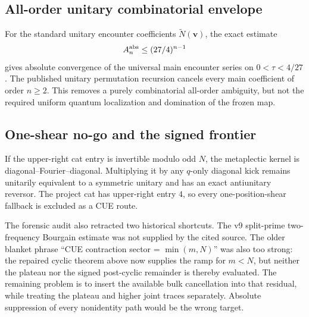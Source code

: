 \subsection{All-order unitary combinatorial envelope}
For the standard unitary encounter coefficients $\widetilde N(\mathbf v)$,
the exact estimate
\[
 A_n^{\rm abs}\le(27/4)^{n-1}
\]
gives absolute convergence of the universal main encounter series on
$0<\tau<4/27$.  The published unitary permutation recursion cancels every
main coefficient of order $n\ge2$.  This removes a purely combinatorial
all-order ambiguity, but not the required uniform quantum localization and
domination of the frozen map.

\subsection{One-shear no-go and the signed frontier}
If the upper-right cat entry is invertible modulo odd $N$, the metaplectic
kernel is diagonal--Fourier--diagonal. Multiplying it by any $q$-only
diagonal kick remains unitarily equivalent to a symmetric unitary and has
an exact antiunitary reversor. The project cat has upper-right entry $4$,
so every one-position-shear fallback is excluded as a CUE route.

The forensic audit also retracted two historical shortcuts. The v9
split-prime two-frequency Bourgain estimate was not supplied by the cited
source. The older blanket phrase ``CUE contraction sector = $\min(m,N)$''
was also too strong: the repaired cyclic theorem above now supplies the ramp
for $m<N$, but neither the plateau nor the signed post-cyclic remainder is
thereby evaluated. The remaining problem is to insert the available bulk
cancellation into that residual, while treating the plateau and higher
joint traces separately. Absolute suppression of every nonidentity path
would be the wrong target.
